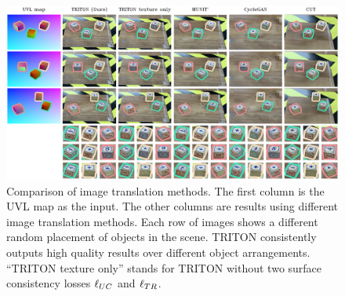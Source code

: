 \documentclass{article}
\begin{document}


\begin{figure}[th]
	\begin{center}
		\includegraphics[width=.9\textwidth]{../images/frame_inconsistency_diagram.png}
	\end{center}
	\vspace{-7pt}
	\caption{
	    Comparison of image translation methods.
	    The first column is the UVL map as the input.
	    The other columns are results using different image translation methods.
		Each row of images shows a different random placement of objects in the scene.
		TRITON consistently outputs high quality results over different object arrangements. 
		``TRITON texture only'' stands for TRITON without two surface consistency losses $\ell_{UC}$ and $\ell_{TR}$.
		}
		\vspace{-15pt}
		\label{fig:frame_inconsistency_diagram}
	\end{figure}
	
\end{document}
